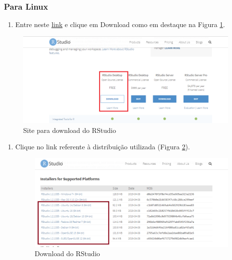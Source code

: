 \documentclass[
]{book}
\providecommand{\tightlist}{%
  \setlength{\itemsep}{0pt}\setlength{\parskip}{0pt}}
\begin{document}
\hypertarget{para-linux-1}{%
\subsubsection{Para Linux}\label{para-linux-1}}

\begin{enumerate}
\def\labelenumi{\arabic{enumi})}
\tightlist
\item
  Entre neste \href{https://www.rstudio.com/products/rstudio/download/}{link} e clique em Download como em destaque na Figura \ref{fig:rslinux1}.
\end{enumerate}

\begin{figure}
\includegraphics[width=1\linewidth]{figures/install_Rstudio1} \caption{\label{fig:rslinux1}Site para download do RStudio}\label{fig:rslinux1}
\end{figure}

\begin{enumerate}
\def\labelenumi{\arabic{enumi})}
\setcounter{enumi}{1}
\tightlist
\item
  Clique no link referente à distribuição utilizada (Figura \ref{fig:rslinux2}).

  \begin{figure}
  \includegraphics[width=1\linewidth]{figures/install_Rstudio_linux} \caption{\label{fig:rslinux2} Download do RStudio}\label{fig:rslinux2}
  \end{figure}
\end{enumerate}
\end{document}
